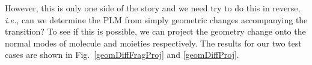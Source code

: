 %






However, this is only one side of the story and we  need try to do this in reverse, {\em i.e.}, can we
determine the PLM from simply geometric changes accompanying the transition? To see if this is possible,
we can project the geometry change onto the normal modes of molecule and moieties respectively.  The
results for our two test cases are shown  in Fig.~\ref{geomDiffFragProj} and \ref{geomDiffProj}.



